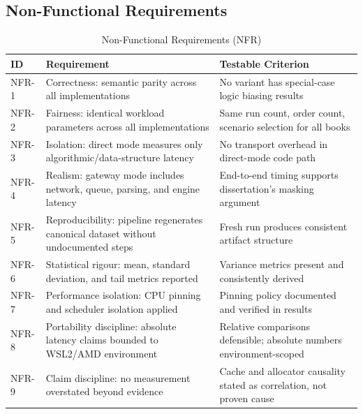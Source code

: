 \subsection{Non-Functional Requirements}
\begin{table}[H]
    \centering
    \small
    \begin{tabular}{lp{5cm}p{6.5cm}}
        \toprule
        \textbf{ID} & \textbf{Requirement} & \textbf{Testable Criterion} \\
        \midrule
        \label{nfr:1} NFR-1 & Correctness: semantic parity across all implementations & No variant has special-case logic biasing results \\
        \label{nfr:2} NFR-2 & Fairness: identical workload parameters across all implementations & Same run count, order count, scenario selection for all books \\
        \label{nfr:3} NFR-3 & Isolation: direct mode measures only algorithmic/data-structure latency & No transport overhead in direct-mode code path \\
        \label{nfr:4} NFR-4 & Realism: gateway mode includes network, queue, parsing, and engine latency & End-to-end timing supports dissertation's masking argument \\
        \label{nfr:5} NFR-5 & Reproducibility: pipeline regenerates canonical dataset without undocumented steps & Fresh run produces consistent artifact structure \\
        \label{nfr:6} NFR-6 & Statistical rigour: mean, standard deviation, and tail metrics reported & Variance metrics present and consistently derived \\
        \label{nfr:7} NFR-7 & Performance isolation: CPU pinning and scheduler isolation applied & Pinning policy documented and verified in results \\
        \label{nfr:8} NFR-8 & Portability discipline: absolute latency claims bounded to WSL2/AMD environment & Relative comparisons defensible; absolute numbers environment-scoped \\
        \label{nfr:9} NFR-9 & Claim discipline: no measurement overstated beyond evidence & Cache and allocator causality stated as correlation, not proven cause \\
        \bottomrule
    \end{tabular}
    \caption{Non-Functional Requirements (NFR)}
    \label{tab:non_functional_requirements}
\end{table}


